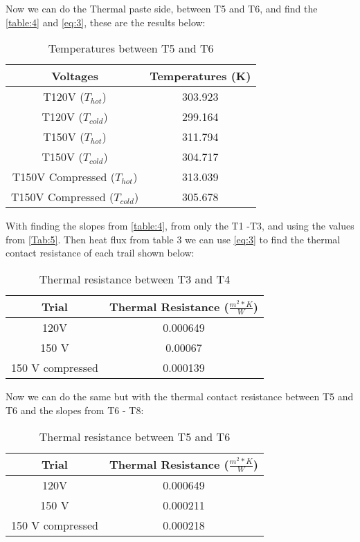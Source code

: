 \documentclass[10pt,twocolumn]{article}
\begin{document}
Now we can do the Thermal paste side, between T5 and T6, and find the \autoref{table:4} and \autoref{eq:3}, these are the results below:

\begin{table}[H]
\centering
\caption{Temperatures between T5 and T6 }
\begin{tabular}{|c|c|}
\hline
\textbf{Voltages}  & \textbf{Temperatures (K)} \\
\hline
T120V ($T_{hot}$) & 303.923 \\
\hline
T120V ($T_{cold}$) & 299.164 \\
\hline
T150V ($T_{hot}$) & 311.794 \\
\hline
T150V ($T_{cold}$) & 304.717 \\
\hline
T150V Compressed ($T_{hot}$) & 313.039 \\
\hline
T150V Compressed ($T_{cold}$) & 305.678 \\
\hline
\end{tabular}
\label{Tab:6}

\end{table}

With finding the slopes from \autoref{table:4}, from only the T1 -T3, and using the values from \autoref{Tab:5}. Then heat flux from table 3 we can use \autoref{eq:3} to find the thermal contact resistance of each trail shown below:

\begin{table}[H]
\centering
\caption{Thermal resistance between T3 and T4}
\begin{tabular}{|c|c|}
\hline
\textbf{Trial} & \textbf{Thermal Resistance ($\frac{m^2*K}{W}$})\\
\hline
120V & 0.000649\\
\hline
150 V & 0.00067 \\
\hline
150 V compressed & 0.000139 \\
\hline
\end{tabular}
\label{Tab:7}

\end{table}

Now we can do the same but with the thermal contact resistance between T5 and T6 and the slopes from T6 - T8:

\begin{table}[H]
\centering
\caption{Thermal resistance between T5 and T6}
\begin{tabular}{|c|c|}
\hline
\textbf{Trial} & \textbf{Thermal Resistance ($\frac{m^2*K}{W}$})\\
\hline
120V & 0.000649\\
\hline
150 V & 0.000211 \\
\hline
150 V compressed & 0.000218 \\
\hline
\end{tabular}
\label{Tab:8}

\end{table}
\end{document}
